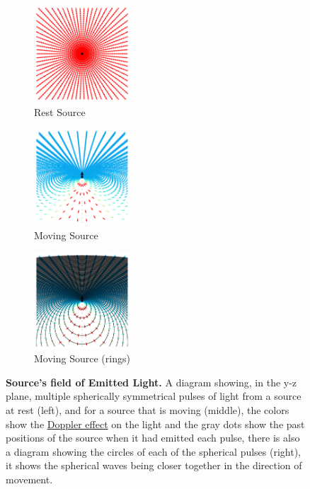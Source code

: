 \begin{figure}[H]
	\centering
	\begin{subfigure}{.3\textwidth}
		\centering
		\includegraphics[width = 3.6cm]{images/pdf/Field_Rest_Frame.pdf}
		\caption{Rest Source}
		\label{subfig: full field transformation 1}
	\end{subfigure}
	\begin{subfigure}{.3\textwidth}
		\centering
		\includegraphics[width = 3.6cm]{images/pdf/Field_Moving_Frame_Doppler.pdf}
		\caption{Moving Source}
		\label{subfig: full field transformation Moving Source}
	\end{subfigure}
	\begin{subfigure}{.3\textwidth}
		\centering
		\includegraphics[width = 3.6cm]{images/pdf/Field_Moving_Frame_Doppler_circles.pdf}
		\caption{Moving Source (rings)}
	\end{subfigure}
	\caption{\textbf{Source's field of Emitted Light.} A diagram showing, in the y-z plane, multiple spherically symmetrical pulses of light from a source at rest (left), and for a source that is moving (middle), the colors show the \protect\hyperlink{def-doppler-effect}{Doppler effect} on the light and the gray dots show the past positions of the source when it had emitted each pulse, there is also a diagram showing the circles of each of the spherical pulses (right), it shows the spherical waves being closer together in the direction of movement.}
	\label{fig: full field transformation}
\end{figure}

